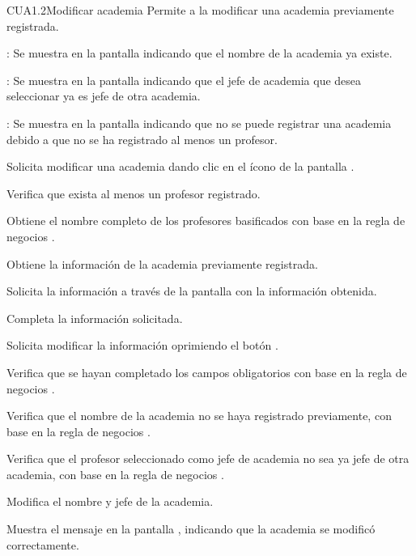 \begin{UseCase}{CUA1.2}{Modificar academia}{	
	Permite a la  modificar una academia previamente registrada.
}
{\begin{UClist}
			\UCli {}: Se muestra en la pantalla  indicando que el nombre de la academia ya existe.
			
			\UCli {}: Se muestra en la pantalla  indicando que el jefe de academia que desea seleccionar ya es jefe de otra academia.
			
			\UCli {}: Se muestra en la pantalla  indicando que no se puede registrar una academia debido a que no se ha registrado al menos un profesor.
		\end{UClist}
	}
\end{UseCase}

\begin{UCtrayectoria}
	\UCpaso [\UCactor] Solicita modificar una academia dando clic en el ícono %
	de la pantalla . 
	
	\UCpaso [\UCsist] Verifica que exista al menos un profesor registrado. 
	
	\UCpaso [\UCsist] Obtiene el nombre completo de los profesores basificados con base en la regla de negocios .
	
	\UCpaso [\UCsist] Obtiene la información de la academia previamente registrada.

	\UCpaso[\UCsist] Solicita la información a través de la pantalla  con la información obtenida.
	
	\UCpaso [\UCactor] Completa la información solicitada. \label{CUA1.1:CompletaInfo}
	
	\UCpaso [\UCactor] Solicita modificar la información oprimiendo el botón . 
	
	\UCpaso [\UCsist] Verifica que se hayan completado los campos obligatorios con base en la regla de negocios . 
	
	\UCpaso [\UCsist] Verifica que el nombre de la academia no se haya registrado previamente, con base en la regla de negocios . 
		
	\UCpaso [\UCsist] Verifica que el profesor seleccionado como jefe de academia no sea ya jefe de otra academia, con base en la regla de negocios . 
	
	\UCpaso [\UCsist] Modifica el nombre y jefe de la academia.
	
	\UCpaso [\UCsist] Muestra el mensaje  en la pantalla , indicando que la academia se modificó correctamente.	
	
\end{UCtrayectoria}

